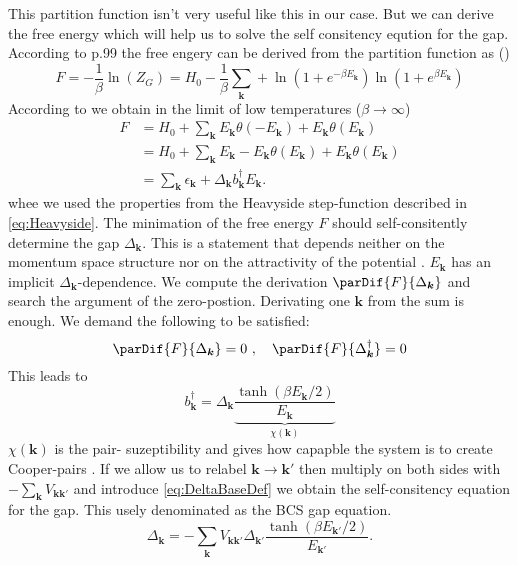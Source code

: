 \documentclass[../main.tex]{subfile}
\begin{document}
This partition function isn't very useful like this in our case. But we can derive the free energy which will help us to solve the self consitency eqution for the gap.\\
According to \cite{FuchsBaugaertel2023} p.99 the free engery can be derived from the partition function as ()
\[
    F = -\frac{1}{\beta}\ln(Z_G) = H_0 -\frac{1}{\beta}\sum_{\bm{k}} + \ln\left(1 + e^{-\beta E_{\bm{k}}}\right)\ln\left(1 + e^{\beta E_{\bm{k}}}\right)
\]
According to \cite{FossheimSudbo2004} we obtain in the limit of low temperatures ($\beta\rightarrow \infty$)
\begin{align*}
    F &= H_0 + \sum_{\bm{k}} E_{\bm{k}} \theta\left(-E_{\bm{k}}\right) + E_{\bm{k}} \theta\left(E_{\bm{k}}\right)\\
      &= H_0 + \sum_{\bm{k}} E_{\bm{k}} - E_{\bm{k}}\theta\left(E_{\bm{k}}\right) + E_{\bm{k}} \theta\left(E_{\bm{k}}\right)\\
      &= \sum_{\bm{k}} \epsilon_{\bm{k}} + \Delta_{\bm{k}}b_{\bm{k}}^{\dagger} E_{\bm{k}}.
\end{align*}
whee we used the properties from the Heavyside step-function described in \ref{eq:Heavyside}.
The minimation of the free energy $F$ should self-consitently determine the gap $\Delta_{\bm{k}}$. This is a statement that depends neither on the momentum space structure
nor on the attractivity of the potential \cite{FossheimSudbo2004}. $E_{\bm{k}}$ has an implicit $\Delta_{\bm{k}}$-dependence.
We compute the derivation $\parDif{F}{\Delta_{\bm{k}}}$ and search the argument of the zero-postion. Derivating one $\bm{k} $ from the sum is enough. We demand the following
to be satisfied:
\begin{equation}
    \parDif{F}{\Delta_{\bm{k}}} = 0 ~,~~~ \parDif{F}{\Delta_{\bm{k}}^{\dagger}} = 0
\end{equation}
This leads to 
\begin{equation*}
    b_{\bm{k}}^{\dagger} = \Delta_{\bm{k}} \underbrace{\frac{\tanh(\beta E_{\bm{k}}/2)}{E_{\bm{k}}}}_{\chi(\bm{k})}
\end{equation*}
$\chi(\bm{k})$ is the pair- suzeptibility and gives how capapble the system is to create Cooper-pairs \cite{FossheimSudbo2004}. If we allow us to relabel $\bm{k}\rightarrow\bm{k}'$ then multiply on both sides
with $-\sum_{\bm{k}} V_{\bm{k}\bm{k}'}$ and introduce \ref{eq:DeltaBaseDef} we obtain the self-consitency equation for the gap. This usely denominated as the BCS gap equation.
\begin{equation}\label{eq:BCS_gap_eq}
    \Delta_{\bm{k}} = -\sum_{\bm{k}} V_{\bm{k}\bm{k}'} \Delta_{\bm{k}'}\frac{\tanh(\beta E_{\bm{k}'}/2)}{E_{\bm{k}'}}.
\end{equation}
\end{document}
